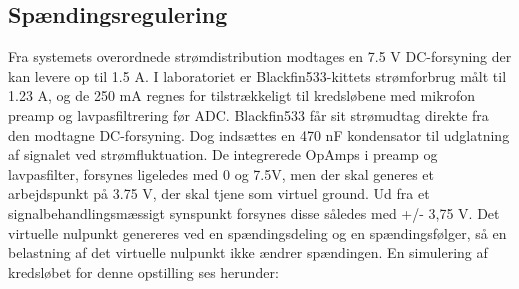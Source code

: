 
\subsection*{Spændingsregulering}
Fra systemets overordnede strømdistribution modtages en 7.5 V DC-forsyning der kan levere op til 1.5 A. I laboratoriet er Blackfin533-kittets strømforbrug målt til 1.23 A, og de 250 mA regnes for tilstrækkeligt til kredsløbene med mikrofon preamp og lavpasfiltrering før ADC.
Blackfin533 får sit strømudtag direkte fra den modtagne DC-forsyning. Dog indsættes en 470 nF kondensator til udglatning af signalet ved strømfluktuation. De integrerede OpAmps i preamp og lavpasfilter, forsynes ligeledes med 0 og 7.5V, men der skal generes et arbejdspunkt på 3.75 V, der skal tjene som virtuel ground. Ud fra et signalbehandlingsmæssigt synspunkt forsynes disse således med +/- 3,75 V.
Det virtuelle nulpunkt genereres ved en spændingsdeling og en spændingsfølger, så en belastning af det virtuelle nulpunkt ikke ændrer spændingen. En simulering af kredsløbet for denne opstilling ses herunder:  



